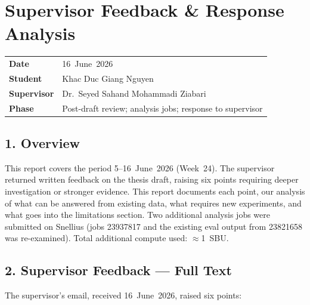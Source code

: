 
\section*{Supervisor Feedback \& Response Analysis}

\begin{tabular}{ll}
    \textbf{Date}       & 16~June~2026 \\
    \textbf{Student}    & Khac Duc Giang Nguyen \\
    \textbf{Supervisor} & Dr.\ Seyed Sahand Mohammadi Ziabari \\
    \textbf{Phase}      & Post-draft review; analysis jobs; response to supervisor \\
\end{tabular}

\vspace{1em}

\subsection*{1. Overview}

This report covers the period 5--16~June~2026 (Week~24). The supervisor
returned written feedback on the thesis draft, raising six points requiring
deeper investigation or stronger evidence. This report documents each point,
our analysis of what can be answered from existing data, what requires new
experiments, and what goes into the limitations section. Two additional
analysis jobs were submitted on Snellius (jobs 23937817 and the existing
eval output from 23821658 was re-examined). Total additional compute used:
$\approx$1~SBU.

\subsection*{2. Supervisor Feedback --- Full Text}

The supervisor's email, received 16~June~2026, raised six points:

